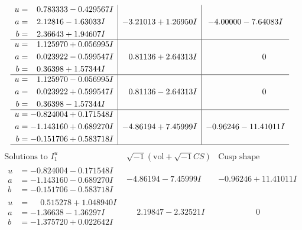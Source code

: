 \documentclass[1p]{elsarticle_modified}
\theoremstyle{definition}
\newcommand{\I}{\sqrt{-1}}
\begin{document}
$$\begin{array}{c|c|c}
\begin{aligned}
u &= \phantom{-}0.783333 - 0.429567 I \\
a &= \phantom{-}2.12816 - 1.63033 I \\
b &= \phantom{-}2.36643 + 1.94607 I\end{aligned}
 & -3.21013 + 1.26950 I & -4.00000 - 7.64083 I \\ \hline\begin{aligned}
u &= \phantom{-}1.125970 + 0.056995 I \\
a &= \phantom{-}0.023922 - 0.599547 I \\
b &= \phantom{-}0.36398 + 1.57344 I\end{aligned}
 & \phantom{-}0.81136 + 2.64313 I & \phantom{-0.000000 } 0 \\ \hline\begin{aligned}
u &= \phantom{-}1.125970 - 0.056995 I \\
a &= \phantom{-}0.023922 + 0.599547 I \\
b &= \phantom{-}0.36398 - 1.57344 I\end{aligned}
 & \phantom{-}0.81136 - 2.64313 I & \phantom{-0.000000 } 0 \\ \hline\begin{aligned}
u &= -0.824004 + 0.171548 I \\
a &= -1.143160 + 0.689270 I \\
b &= -0.151706 + 0.583718 I\end{aligned}
 & -4.86194 + 7.45999 I & -0.96246 - 11.41011 I\\
 \hline 
 \end{array}$$\newpage$$\begin{array}{c|c|c}  
\text{Solutions to }I^u_{1}& \I (\text{vol} + \sqrt{-1}CS) & \text{Cusp shape}\\
 \hline 
\begin{aligned}
u &= -0.824004 - 0.171548 I \\
a &= -1.143160 - 0.689270 I \\
b &= -0.151706 - 0.583718 I\end{aligned}
 & -4.86194 - 7.45999 I & -0.96246 + 11.41011 I \\ \hline\begin{aligned}
u &= \phantom{-}0.515278 + 1.048940 I \\
a &= -1.36638 - 1.36297 I \\
b &= -1.375720 + 0.022642 I\end{aligned}
 & \phantom{-}2.19847 - 2.32521 I & \phantom{-0.000000 } 0 \\ \hline\begin{aligned}

\end{aligned}
\end{array}$$
\end{document}
